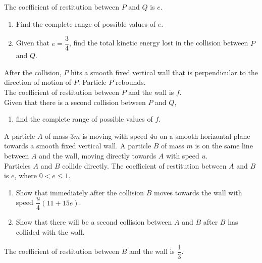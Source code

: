 \documentclass[leqno]{article}
\begin{document}
\begin{enumerate}[
  label=\textbf{\arabic*.},
  leftmargin=*,
  topsep=0pt,
  partopsep=0pt,
  parsep=0pt
]
The coefficient of restitution between $P$ and $Q$ is $e$. \\
\begin{enumerate}[label=\textbf{(\alph*)}]
  \item Find the complete range of possible values of $e$.  \\
  \item Given that $e=\dfrac{3}{4}$, find the total kinetic energy lost in the collision between $P$ and $Q$.  \\
\end{enumerate}
After the collision, $P$ hits a smooth fixed vertical wall that is perpendicular to the direction of motion of $P$. Particle $P$ rebounds. \\
The coefficient of restitution between $P$ and the wall is $f$. \\

Given that there is a second collision between $P$ and $Q$, \\
\begin{enumerate}[label=\textbf{(\alph*)}, resume]
  \item find the complete range of possible values of $f$.  \\
\end{enumerate}

\newpage

\questionitem

A particle $A$ of mass $3m$ is moving with speed $4u$ on a smooth horizontal plane towards a smooth fixed vertical wall. A particle $B$ of mass $m$ is on the same line between $A$ and the wall, moving directly towards $A$ with speed $u$. \\

Particles $A$ and $B$ collide directly. The coefficient of restitution between $A$ and $B$ is $e$, where $0<e\le 1$. \\
\begin{enumerate}[label=\textbf{(\alph*)}]
  \item Show that immediately after the collision $B$ moves towards the wall with speed $\dfrac{u}{4}(11+15e)$.  \\
  \item Show that there will be a second collision between $A$ and $B$ after $B$ has collided with the wall.  \\
\end{enumerate}
The coefficient of restitution between $B$ and the wall is
\(
\dfrac{1}{3}
\). \\


\end{enumerate}
\end{document}
